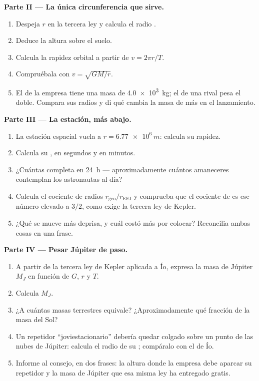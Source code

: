 \begin{problem}
\medskip
\noindent\textbf{Parte II --- La única circunferencia que sirve.}
\begin{enumerate}[resume]
  \item Despeja $r$ en la tercera ley y calcula el radio .
  \item Deduce la altura sobre el suelo.
  \item Calcula la rapidez orbital a partir de $v = 2\pi r/T$.
  \item Compruébala con $v = \sqrt{GM/r}$.
  \item El  de la empresa tiene una masa de \qty{4.0e3}{kg}; el de una rival
        pesa el doble. Compara sus radios  y di qué cambia la masa de
        más en el lanzamiento.
\end{enumerate}

\medskip
\noindent\textbf{Parte III --- La estación, más abajo.}
\begin{enumerate}[resume]
  \item La estación espacial vuela a $r = \qty{6.77e6}{m}$: calcula su rapidez.
  \item Calcula su , en segundos y en minutos.
  \item ¿Cuántas  completa en \qty{24}{h} --- aproximadamente cuántos amaneceres
        contemplan los astronautas al día?
  \item Calcula el cociente de radios $r_{\text{geo}}/r_{\text{EEI}}$ y comprueba que el
        cociente de  es ese número elevado a $3/2$, como exige la tercera ley
        de Kepler.
  \item ¿Qué  se mueve más deprisa, y cuál costó más  por 
        colocar? Reconcilia ambas cosas en una frase.
\end{enumerate}

\medskip
\noindent\textbf{Parte IV --- Pesar Júpiter de paso.}
\begin{enumerate}[resume]
  \item A partir de la tercera ley de Kepler aplicada a Ío, expresa la masa de Júpiter
        $M_J$ en función de $G$, $r$ y $T$.
  \item Calcula $M_J$.
  \item ¿A cuántas masas terrestres equivale? ¿Aproximadamente qué fracción de la masa
        del Sol?
  \item Un repetidor ``joviestacionario'' debería quedar colgado sobre un punto de las
        nubes de Júpiter: calcula el radio de su ; compáralo con el de Ío.
  \item Informe al consejo, en dos frases: la altura donde la empresa debe aparcar su
        repetidor y la masa de Júpiter que esa misma ley ha entregado gratis.
\end{enumerate}
\end{problem}
